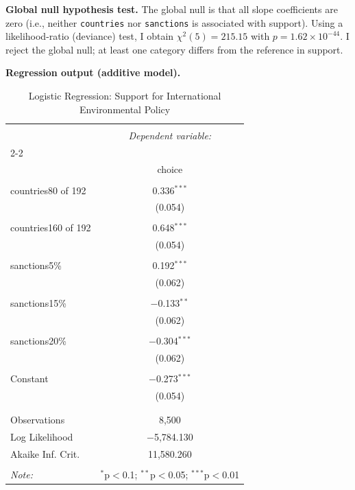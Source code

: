 \documentclass[12pt,letterpaper]{article}
\begin{document}
\vspace{0.75em}
\noindent\textbf{Global null hypothesis test.}
The global null is that all slope coefficients are zero (i.e., neither \texttt{countries} nor \texttt{sanctions} is associated with support). Using a likelihood-ratio (deviance) test, I obtain $\chi^2(5)=215.15$ with $p=1.62\times 10^{-44}$. I reject the global null; at least one category differs from the reference in support.

\vspace{1.0em}
\noindent\textbf{Regression output (additive model).}
\begin{table}[!htbp] \centering 
	\small
	\caption{Logistic Regression: Support for International Environmental Policy} 
	\label{tab:model1} 
	\begin{tabular}{@{\extracolsep{5pt}}lc} 
		\\[-1.8ex]\hline 
		\hline \\[-1.8ex] 
		& \multicolumn{1}{c}{\textit{Dependent variable:}} \\ 
		\cline{2-2} 
		\\[-1.8ex] & choice \\ 
		\hline \\[-1.8ex] 
		countries80 of 192 & 0.336$^{***}$ \\ 
		& (0.054) \\ 
		& \\ 
		countries160 of 192 & 0.648$^{***}$ \\ 
		& (0.054) \\ 
		& \\ 
		sanctions5\% & 0.192$^{***}$ \\ 
		& (0.062) \\ 
		& \\ 
		sanctions15\% & $-$0.133$^{**}$ \\ 
		& (0.062) \\ 
		& \\ 
		sanctions20\% & $-$0.304$^{***}$ \\ 
		& (0.062) \\ 
		& \\ 
		Constant & $-$0.273$^{***}$ \\ 
		& (0.054) \\ 
		& \\ 
		\hline \\[-1.8ex] 
		Observations & 8,500 \\ 
		Log Likelihood & $-$5,784.130 \\ 
		Akaike Inf. Crit. & 11,580.260 \\ 
		\hline 
		\hline \\[-1.8ex] 
		\textit{Note:}  & \multicolumn{1}{r}{$^{*}$p$<$0.1; $^{**}$p$<$0.05; $^{***}$p$<$0.01} \\ 
	\end{tabular} 
\end{table} 
\end{document}
